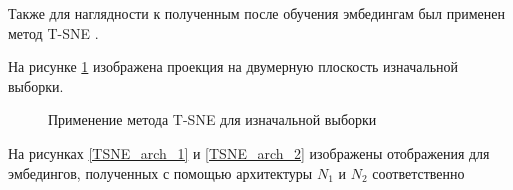 Также для наглядности к полученным после обучения эмбедингам был применен метод T-SNE \cite{TSNE}. 

На рисунке \ref{TSNE_first} изображена проекция на двумерную плоскость изначальной выборки.

\begin{figure}[H]
        \caption{Применение метода T-SNE для изначальной выборки}
        \label{TSNE_first}
\end{figure} 

На рисунках \ref{TSNE_arch_1} и \ref{TSNE_arch_2} изображены отображения для эмбедингов, полученных с помощью архитектуры $N_1$ и $N_2$ соответственно

